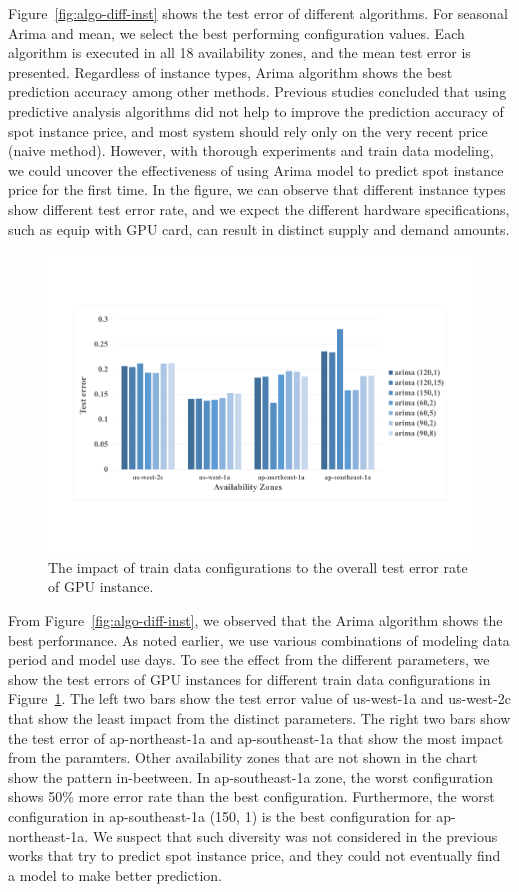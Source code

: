 \documentclass[graybox]{svmult}
\begin{document}
Figure~\ref{fig:algo-diff-inst} shows the test error of different algorithms. For seasonal Arima and mean, we select the best performing configuration values. Each algorithm is executed in all 18 availability zones, and the mean test error is presented. Regardless of instance types, Arima algorithm shows the best prediction accuracy among other methods. Previous studies concluded that using predictive analysis algorithms did not help to improve the prediction accuracy of spot instance price, and most system should rely only on the very recent price (naive method). However, with thorough experiments and train data modeling, we could uncover the effectiveness of using Arima model to predict spot instance price for the first time. In the figure, we can observe that different instance types show different test error rate, and we expect the different hardware specifications, such as equip with GPU card, can result in distinct supply and demand amounts.  
\begin{figure}
\centering\includegraphics[width=1.2\textwidth]{figures/g2-4m-l.pdf}\caption{The impact of train data configurations to the overall test error rate of GPU instance.\label{fig:g2-param-diverse}}
\end{figure}
From Figure~\ref{fig:algo-diff-inst}, we observed that the Arima algorithm shows the best performance. As noted earlier, we use various combinations of modeling data period and model use days. To see the effect from the different parameters, we show the test errors of GPU instances for different train data configurations in Figure~\ref{fig:g2-param-diverse}. The left two bars show the test error value of us-west-1a and us-west-2c that show the least impact from the distinct parameters. The right two bars show the test error of ap-northeast-1a and ap-southeast-1a that show the most impact from the paramters. Other availability zones that are not shown in the chart show the pattern in-beetween. In ap-southeast-1a zone, the worst configuration shows 50\% more error rate than the best configuration. Furthermore, the worst configuration in ap-southeast-1a (150, 1) is the best configuration for ap-northeast-1a. We suspect that such diversity was not considered in the previous works that try to predict spot instance price, and they could not eventually find a model to make better prediction. 
\end{document}
